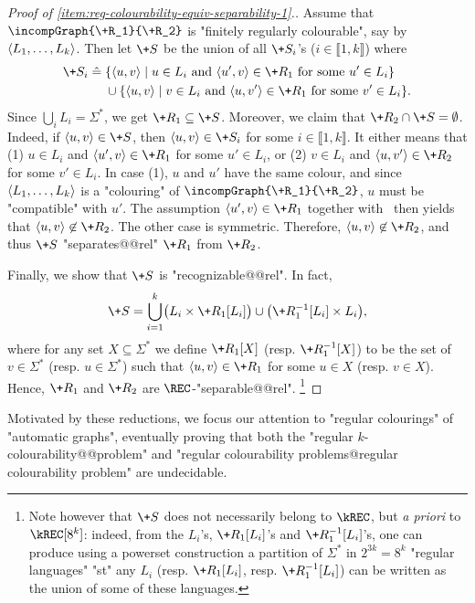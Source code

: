 \begin{proof}[Proof of \eqref{item:reg-colourability-equiv-separability-1}.]
    Assume that $\incompGraph{\+R_1}{\+R_2}$ is "finitely regularly colourable", say by
    $\langle L_1,\dotsc,L_k\rangle$. Then let $\+S$ be the union of all $\+S_i$'s ($i \in \lBrack 1,k\rBrack$) where
    \begin{align*}
        \+S_i \defeq\; & \{\tup{u,v} \mid u \in L_i \text{ and } \tup{u',v} \in \+R_1 \text{ for some } u' \in L_i \}\\
        & \cup \{\tup{u,v} \mid v \in L_i \text{ and } \tup{u,v'} \in \+R_1 \text{ for some } v' \in L_i \}.  
    \end{align*}
    Since $\bigcup_i L_i = \Sigma^*$, we get $\+R_1 \subseteq \+S$.
    Moreover, we claim that $\+R_2 \cap \+S = \emptyset$. Indeed, if $\tup{u,v} \in \+S$,
    then $\tup{u,v} \in \+S_i$ for some $i \in \lBrack 1,k\rBrack$. It either means that
    (1) $u\in L_i$ and $\tup{u',v} \in \+R_1$ for some $u' \in L_i$, or
    (2) $v\in L_i$ and $\tup{u,v'} \in \+R_2$
    for some $v' \in L_i$. In case (1), $u$ and $u'$
    have the same colour, and since $\langle L_1,\dotsc,L_k\rangle$ is a "colouring"
    of $\incompGraph{\+R_1}{\+R_2}$, $u$ must be "compatible" with $u'$.
    The assumption $\tup{u',v} \in \+R_1$ together with \compLpr\ then yields
    that $\tup{u,v} \not\in \+R_2$. The other case is symmetric.
    Therefore, $\tup{u,v} \not\in \+R_2$, and thus $\+S$ "separates@@rel" $\+R_1$ from $\+R_2$.

    Finally, we show that $\+S$ is "recognizable@@rel". In fact, 
    \[
        \+S = \bigcup_{i=1}^k \bigl(
            L_i \times \+R_1[L_i]
        \bigr) \cup \bigl(
            \+R_1^{-1}[L_i] \times L_i
        \bigr),
    \] 
    where for any set $X \subseteq \Sigma^*$ we define $\+R_1[X]$ (resp. $\+R_1^{-1}[X]$)
    to be the set of $v\in \Sigma^*$ (resp. $u \in \Sigma^*$) such that
    $\tup{u,v} \in \+R_1$ for some $u \in X$ (resp. $v\in X$).
    Hence, $\+R_1$ and $\+R_2$ are $\REC$-"separable@@rel".%
    \footnote{%
        Note however that $\+S$ does not necessarily belong to $\kREC$,
        but \emph{a priori} to $\kREC[8^k]$: indeed, from the
        $L_i$'s, $\+R_1[L_i]$'s and $\+R_1^{-1}[L_i]$'s,
        one can produce using a powerset construction a partition of $\Sigma^*$
        in $2^{3k} = 8^k$ "regular languages" "st" any $L_i$ (resp. $\+R_1[L_i]$,
        resp. $\+R_1^{-1}[L_i]$) can be written as the union of some of these languages.
    }
\end{proof}

Motivated by these reductions, we focus our attention to "regular colourings" of "automatic graphs",
eventually proving that both the "regular $k$-colourability@@problem" and
"regular colourability problems@regular colourability problem" are undecidable.
